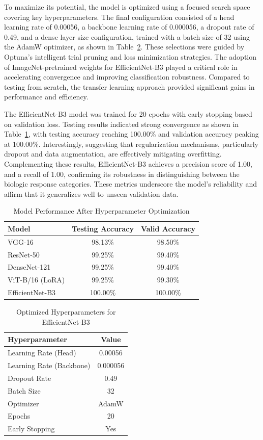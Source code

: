 \documentclass[11pt,journal,compsoc]{IEEEtran}
\begin{document}
To maximize its potential, the model is optimized using a focused search space covering key hyperparameters. The final configuration consisted of a head learning rate of 0.00056, a backbone learning rate of 0.000056, a dropout rate of 0.49, and a dense layer size configuration, trained with a batch size of 32 using the AdamW optimizer, as shown in Table~\ref{tab:opt_hyperparams}. These selections were guided by Optuna’s intelligent trial pruning and loss minimization strategies. The adoption of ImageNet-pretrained weights for EfficientNet-B3 played a critical role in accelerating convergence and improving classification robustness. Compared to testing from scratch, the transfer learning approach provided significant gains in performance and efficiency.

The EfficientNet-B3 model was trained for 20 epochs with early stopping based on validation loss. Testing results indicated strong convergence as shown in Table~\ref{tab:hpo_results}, with testing accuracy reaching 100.00\% and validation accuracy peaking at 100.00\%. Interestingly, suggesting that regularization mechanisms, particularly dropout and data augmentation, are effectively mitigating overfitting. Complementing these results, EfficientNet-B3 achieves a precision score of 1.00, and a recall of 1.00, confirming its robustness in distinguishing between the biologic response categories. These metrics underscore the model’s reliability and affirm that it generalizes well to unseen validation data.

\begin{table}[h]
\centering
\caption{Model Performance After Hyperparameter Optimization}
\label{tab:hpo_results}
\begin{tabular}{lcc}
\toprule
Model & Testing Accuracy & Valid Accuracy \\
\midrule
VGG-16 & 98.13\% & 98.50\% \\
ResNet-50 & 99.25\% & 99.40\% \\
DenseNet-121 & 99.25\% & 99.40\% \\
ViT-B/16 (LoRA) & 99.25\% & 99.30\% \\
EfficientNet-B3 & 100.00\% & 100.00\% \\
\bottomrule
\end{tabular}
\end{table}

\begin{table}[h]
\centering
\caption{Optimized Hyperparameters for EfficientNet-B3}
\label{tab:opt_hyperparams}
\begin{tabular}{lc}
\toprule
Hyperparameter & Value \\
\midrule
Learning Rate (Head) & 0.00056 \\
Learning Rate (Backbone) & 0.000056 \\
Dropout Rate & 0.49 \\
Batch Size & 32 \\
Optimizer & AdamW \\
Epochs & 20 \\
Early Stopping & Yes \\
\bottomrule
\end{tabular}
\end{table}
\end{document}

